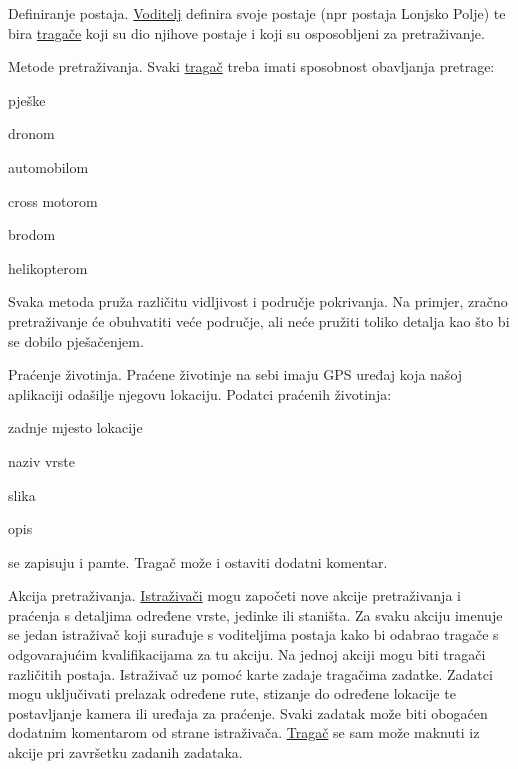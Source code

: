 \begin{packed_item}
\item[3)] Definiranje postaja. \underline{Voditelj} definira svoje postaje (npr postaja Lonjsko Polje) te bira \underline{tragače} koji su dio njihove postaje i koji su osposobljeni za pretraživanje. \\

\item[4)] Metode pretraživanja. Svaki \underline{tragač} treba imati sposobnost obavljanja pretrage:

\begin{packed_item}
	\item[a)] pješke
	\item[b)] dronom
	\item[c)] automobilom 
	\item[d)] cross motorom 
	\item[e)] brodom 
	\item[f)] helikopterom 
	
\end{packed_item}

Svaka metoda pruža različitu vidljivost i područje pokrivanja. Na primjer, zračno pretraživanje će obuhvatiti veće područje, ali neće pružiti toliko detalja kao što bi se dobilo pješačenjem.\\

\item[5)] Praćenje životinja. Praćene životinje na sebi imaju GPS uređaj koja našoj aplikaciji odašilje njegovu lokaciju. Podatci praćenih životinja:

\begin{packed_item}
	\item[a)] zadnje mjesto lokacije
	\item[b)] naziv vrste
	\item[c)] slika 
	\item[d)] opis 
	
\end{packed_item}

se zapisuju i pamte. Tragač može i ostaviti dodatni komentar.\\

\item[6)] Akcija pretraživanja. \underline{Istraživači} mogu započeti nove akcije pretraživanja i praćenja s detaljima određene vrste, jedinke ili staništa. Za svaku akciju imenuje se jedan istraživač koji surađuje s voditeljima postaja kako bi odabrao tragače s odgovarajućim kvalifikacijama za tu akciju. Na jednoj akciji mogu biti tragači različitih postaja. Istraživač uz pomoć karte zadaje tragačima zadatke. Zadatci mogu uključivati prelazak određene rute, stizanje do određene lokacije te postavljanje kamera ili uređaja za praćenje. Svaki zadatak može biti obogaćen dodatnim komentarom od strane istraživača. \underline{Tragač} se sam može maknuti iz akcije pri završetku zadanih zadataka. \\


\end{packed_item}
